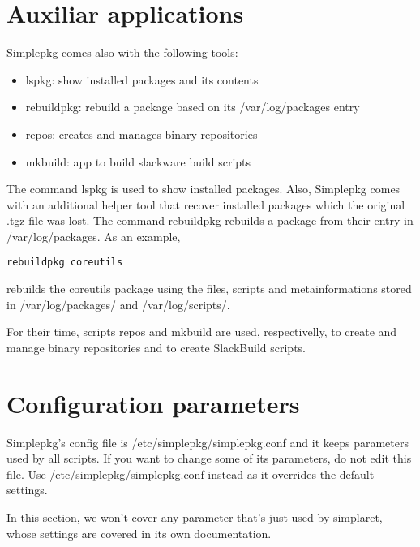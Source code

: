 \documentclass{article}
\begin{document}
\section{Auxiliar applications}

Simplepkg comes also with the following tools:

\begin{itemize}
   \item lspkg: show installed packages and its contents
   \item rebuildpkg: rebuild a package based on its /var/log/packages entry
   \item repos: creates and manages binary repositories
   \item mkbuild: app to build slackware build scripts
\end{itemize}

The command lspkg is used to show installed packages. Also, Simplepkg comes with an additional helper tool that recover installed packages which the original .tgz file was lost. The command rebuildpkg rebuilds a package from their entry in /var/log/packages. As an example,

\begin{verbatim}
rebuildpkg coreutils
\end{verbatim}

rebuilds the coreutils package using the files, scripts and metainformations stored in /var/log/packages/ and /var/log/scripts/.

For their time, scripts repos and mkbuild are used, respectivelly, to create and manage binary repositories and to create SlackBuild scripts.

\section{Configuration parameters}

Simplepkg's config file is /etc/simplepkg/simplepkg.conf and it keeps parameters used by all scripts. If you want to change some of its parameters, do not edit this file. Use /etc/simplepkg/simplepkg.conf instead as it overrides the default settings.

In this section, we won't cover any parameter that's just used by simplaret, whose settings are covered in its own documentation.
\end{document}
